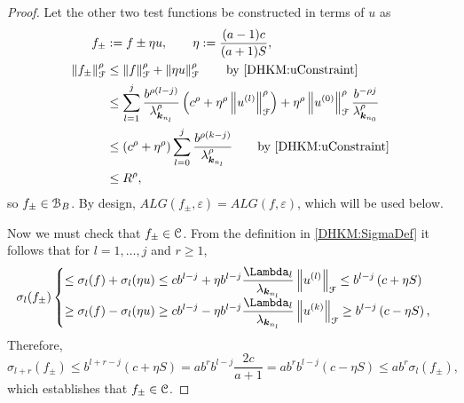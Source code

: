 \documentclass[USenglish]{article}
\theoremstyle{dgthm}
\theoremstyle{dgthm}
\theoremstyle{dgthm}
\theoremstyle{dgthm}
\theoremstyle{dgdef}
\theoremstyle{definition}
\newcommand{\norm}[2][{}]{\ensuremath{\left \lVert #2 \right \rVert}_{#1}}
\begin{document}
\begin{proof}
Let the other two test functions be constructed in terms of $u$ as 
\begin{align}
\nonumber
f_\pm & := f \pm \eta u, \qquad \eta : =  \frac {(a-1)c}{(a+1)S}, \\
\nonumber
\norm[\calF]{f_\pm}^\rho & \le \norm[\calF]{f}^\rho + \norm[\calF]{\eta u }^\rho \qquad \text{by \eqref{DHKM:uConstraint}} \\
& \nonumber 
\le \sum_{l=1}^j \frac{ b^{\rho(l-j)}}{\lambda^\rho_{\bsk_{n_l}}} \left(c^\rho+ \eta^\rho \norm[\calF]{u^{(l)}}^\rho\right) + \eta^\rho \norm[\calF]{u^{(0)}}^\rho \frac{b^{-\rho j}}{\lambda_{\bsk_{n_0}}^\rho}\\
\nonumber
& \le  \left(c^\rho+ \eta^\rho \right) \sum_{l=0}^j \frac{ b^{\rho(k-j)}}{\lambda^\rho_{\bsk_{n_l}}}  \qquad \text{by \eqref{DHKM:uConstraint}}\\
& \nonumber 
\le R^{\rho},
\end{align} 
so $f_{\pm} \in {\mathcal{B}}_{B}$.  By design, $ALG(f_\pm,\varepsilon) = ALG(f,\varepsilon)$, which will be used below.


Now we must check that $f_\pm \in {\mathcal{C}}$. From the definition in \eqref{DHKM:SigmaDef} it follows that for $l = 1, \ldots, j$ and $r \ge 1$,
\begin{equation*}
\sigma_l(f_\pm)  \begin{cases} 
\displaystyle
\le \sigma_l(f) + \sigma_l(\eta u)\le 
c b^{l-j} + \eta b^{l-j}\frac{\Lambda_l}{\lambda_{\bsk_{n_l}}}\norm[\calF]{u^{(l)} }
\le b^{l-j}\left(c+ \eta S \right)
\\[1ex]
\displaystyle
\ge \sigma_l(f) - \sigma_l(\eta u)\ge 
c b^{l-j} - \eta b^{l-j} \frac{\Lambda_l}{\lambda_{\bsk_{n_l}}}\norm[\calF]{u^{(k)}  }
\ge b^{l-j}\left(c-\eta S\right) , 
\end{cases}
\end{equation*}
Therefore, 
\begin{equation*}
\sigma_{l+r}(f_\pm)
\le b^{l+r-j}(c+\eta S) = ab^r b^{l-j}\frac{2c}{a+1}
=ab^r b^{l-j}\left(c-\eta S \right) \le a b^r \sigma_{l}(f_\pm),
\end{equation*}
which establishes that $f_\pm \in {\mathcal{C}}$.


\end{proof}
\end{document}
